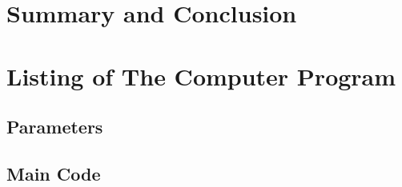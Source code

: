 \documentclass[11pt, a4paper]{article}
\begin{document}
\section{Summary and Conclusion}

\newpage
\appendix
\section{Listing of The Computer Program}
\subsection{Parameters}

\subsection{Main Code}
\end{document}

